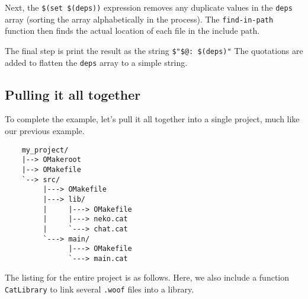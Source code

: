 Next, the \verb+$(set $(deps))+ expression removes any duplicate values in the \verb+deps+ array
(sorting the array alphabetically in the process).  The \verb+find-in-path+ function then finds the
actual location of each file in the include path.

The final step is print the result as the string \verb+$"$@: $(deps)"+ The quotations are added to
flatten the \verb+deps+ array to a simple string.

\subsection{Pulling it all together}

To complete the example, let's pull it all together into a single project, much like our previous
example.

\begin{verbatim}
    my_project/
    |--> OMakeroot
    |--> OMakefile
    `--> src/
         |---> OMakefile
         |---> lib/
         |     |---> OMakefile
         |     |---> neko.cat
         |     `---> chat.cat
         `---> main/
               |---> OMakefile
               `---> main.cat
\end{verbatim}

The listing for the entire project is as follows.  Here, we also include a function
\verb+CatLibrary+ to link several \verb+.woof+ files into a library.


